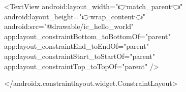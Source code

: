                 <TextView
                    android:layout_width="👉match_parent👈"
                    android:layout_height="👉wrap_content👈"
                    android:src="@drawable/ic_hello_world"
                    app:layout_constraintBottom_toBottomOf="parent"
                    app:layout_constraintEnd_toEndOf="parent"
                    app:layout_constraintStart_toStartOf="parent"
                    app:layout_constraintTop_toTopOf="parent" />
            
            </androidx.constraintlayout.widget.ConstraintLayout>